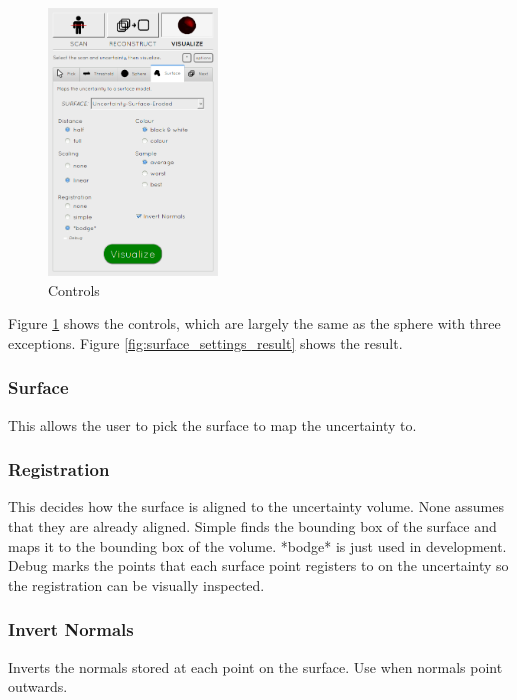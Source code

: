 \begin{figure}
  \vspace{-20pt}
  \includegraphics[width=0.4\textwidth]{images/tool/4_surface.png}
  \caption{Controls}\label{fig:surface_settings}
\end{figure}

Figure \ref{fig:surface_settings} shows the controls, which are largely the same as the sphere with three exceptions. Figure \ref{fig:surface_settings_result} shows the result.

\subsubsection{Surface}
This allows the user to pick the surface to map the uncertainty to.

\subsubsection{Registration}
This decides how the surface is aligned to the uncertainty volume. None assumes that they are already aligned. Simple finds the bounding box of the surface and maps it to the bounding box of the volume. *bodge* is just used in development. Debug marks the points that each surface point registers to on the uncertainty so the registration can be visually inspected.

\subsubsection{Invert Normals}
Inverts the normals stored at each point on the surface. Use when normals point outwards.

